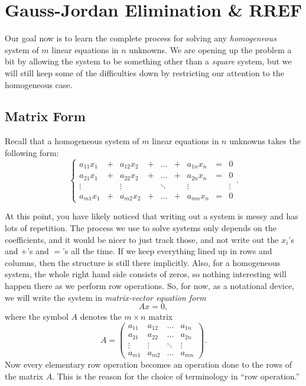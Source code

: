 \documentclass[elementsmain.tex]{subfiles}
\begin{document}
\section{Gauss-Jordan Elimination \& RREF}

Our goal now is to learn the complete process for solving any \emph{homogeneous} system of $m$ linear equations in $n$ unknowns. We are opening up the problem a bit by allowing the system to be something other than a \emph{square} system, but we will still keep some of the difficulties down by restricting our attention to the homogeneous case. 


\subsection*{Matrix Form}

Recall that a homogeneous system of $m$ linear equations in $n$ unknowns takes the following form:
\begin{equation*}
\left\{
\begin{array}{ccccccccc}
a_{11} x_1 & + & a_{12} x_2 & + & \dots & + & a_{1n} x_n & = & 0 \\
a_{21} x_1 & + & a_{22} x_2 & + & \dots & + & a_{2n} x_n & = & 0 \\
\vdots     &   & \vdots     &   & \ddots &  & \vdots     &  & \vdots \\ 
a_{m1} x_1 & + & a_{m2} x_2 & + & \dots & + & a_{mn} x_n & = & 0 
\end{array}\right..
\end{equation*}

At this point, you have likely noticed that writing out a system is messy and has lots of repetition. The process we use to solve systems only depends on the coefficients, and it would be nicer to just track those, and not write out the $x_i$'s and $+$'s and $=$'s all the time. If we keep everything lined up in rows and columns, then the structure is still there implicitly. Also, for a homogeneous system, the whole right hand side consists of zeros, so nothing interesting will happen there as we perform row operations. So, for now, as a notational device, we will write the system in \emph{matrix-vector equation form}
\begin{equation*}
Ax = 0,
\end{equation*}
where the symbol $A$ denotes the $m\times n$ matrix
\begin{equation*}
A = \begin{pmatrix} a_{11} & a_{12} & \dots & a_{1n} \\
a_{21} & a_{22} & \dots & a_{2n} \\
\vdots & \vdots & \ddots & \vdots\\
a_{m1} & a_{m2} & \dots & a_{mn}
\end{pmatrix}.
\end{equation*}
Now every elementary row operation becomes an operation done to the rows of the matrix $A$. This is the reason for the choice of terminology in ``row operation.''
\end{document}
